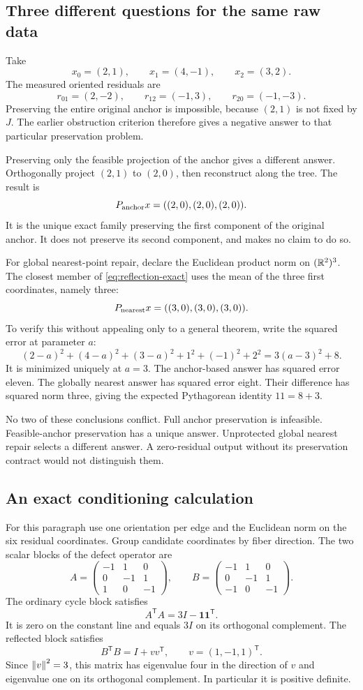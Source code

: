 \subsection{Three different questions for the same raw data}
Take
\[
 x_0=(2,1),\qquad x_1=(4,-1),\qquad x_2=(3,2).
\]
The measured oriented residuals are
\[
 r_{01}=(2,-2),\qquad r_{12}=(-1,3),\qquad r_{20}=(-1,-3).
\]
Preserving the entire original anchor is impossible, because \((2,1)\) is not fixed by \(J\). The earlier obstruction criterion therefore gives a negative answer to that particular preservation problem.

Preserving only the feasible projection of the anchor gives a different answer. Orthogonally project \((2,1)\) to \((2,0)\), then reconstruct along the tree. The result is
\[
 P_{\rm anchor}x=((2,0),(2,0),(2,0)).
\]
It is the unique exact family preserving the first component of the original anchor. It does not preserve its second component, and makes no claim to do so.

For global nearest-point repair, declare the Euclidean product norm on \((\mathbb R^2)^3\). The closest member of \eqref{eq:reflection-exact} uses the mean of the three first coordinates, namely three:
\[
 P_{\rm nearest}x=((3,0),(3,0),(3,0)).
\]
To verify this without appealing only to a general theorem, write the squared error at parameter \(a\):
\[
 (2-a)^2+(4-a)^2+(3-a)^2+1^2+(-1)^2+2^2
 =3(a-3)^2+8.
\]
It is minimized uniquely at \(a=3\). The anchor-based answer has squared error eleven. The globally nearest answer has squared error eight. Their difference has squared norm three, giving the expected Pythagorean identity \(11=8+3\).

No two of these conclusions conflict. Full anchor preservation is infeasible. Feasible-anchor preservation has a unique answer. Unprotected global nearest repair selects a different answer. A zero-residual output without its preservation contract would not distinguish them.

\subsection{An exact conditioning calculation}
For this paragraph use one orientation per edge and the Euclidean norm on the six residual coordinates. Group candidate coordinates by fiber direction. The two scalar blocks of the defect operator are
\[
 A=\begin{pmatrix}-1&1&0\\0&-1&1\\1&0&-1\end{pmatrix},\qquad
 B=\begin{pmatrix}-1&1&0\\0&-1&1\\-1&0&-1\end{pmatrix}.
\]
The ordinary cycle block satisfies
\[
 A^{\mathsf T}A=3I-\mathbf1\mathbf1^{\mathsf T}.
\]
It is zero on the constant line and equals \(3I\) on its orthogonal complement. The reflected block satisfies
\[
 B^{\mathsf T}B=I+vv^{\mathsf T},\qquad v=(1,-1,1)^{\mathsf T}.
\]
Since \(\left\lVert v\right\rVert^2=3\), this matrix has eigenvalue four in the direction of \(v\) and eigenvalue one on its orthogonal complement. In particular it is positive definite.

